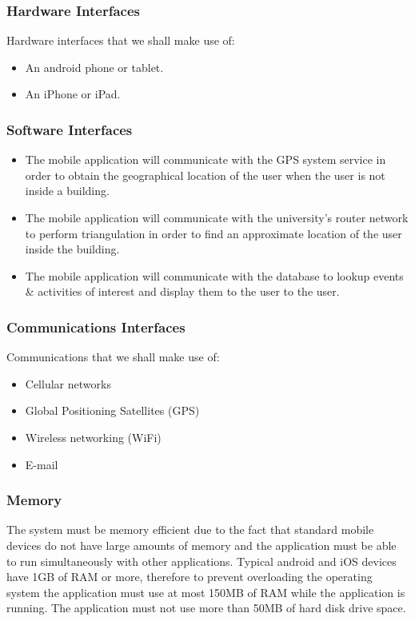 \documentclass[english]{article}
\begin{document}
				\subsubsection{Hardware Interfaces}
				    Hardware interfaces that we shall make use of:
						\begin{itemize}
						    \item An android phone or tablet.
						    \item An iPhone or iPad.
						\end{itemize}

				\subsubsection{Software Interfaces}
				\begin{itemize}
					\item The mobile application will communicate with the GPS system service in order to obtain the geographical location of the user when the user is not inside a building.
					\item The mobile application will communicate with the university's router network to perform triangulation in order to find an approximate location of the user inside the building.
					\item The mobile application will communicate with the database to lookup events \& activities of interest and display them to the user to the user.
				\end{itemize}
						

				\subsubsection{Communications Interfaces}
				    Communications that we shall make use of:
					\begin{itemize}
					    \item Cellular networks
					    \item Global Positioning Satellites (GPS)
					    \item Wireless networking (WiFi)
					    \item E-mail
					\end{itemize}

				\subsubsection{Memory}
					The system must be memory efficient due to the fact that standard mobile devices do not have large amounts of memory and the application must be able to run simultaneously with other applications.  
                    Typical android and iOS devices have 1GB of RAM or more, therefore to prevent overloading the operating system the application must use at most 150MB of RAM while the application is running.
                    The application must not use more than 50MB of hard disk drive space.
\end{document}
